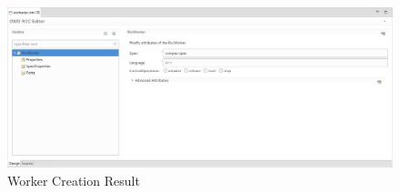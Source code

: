 \begin{flushleft}
\begin{figure}[h!]
  \centering
  \includegraphics[scale=0.31]{figures/workerresult.jpg}
  \caption{Worker Creation Result}
  \label{fig:figure11}
\end{figure}

\end{flushleft}

\newpage

